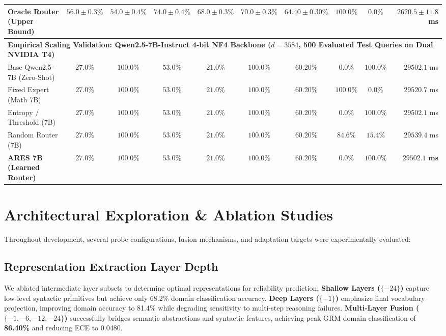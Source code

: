 \documentclass[journal,10pt,twocolumn]{IEEEtran}
\begin{document}
\begin{table}[t]
{\begin{tabular}{lccccccccr}
Oracle Router (Upper Bound) & $56.0 \pm 0.3\%$ & $54.0 \pm 0.4\%$ & $74.0 \pm 0.4\%$ & $68.0 \pm 0.3\%$ & $70.0 \pm 0.3\%$ & $64.40 \pm 0.30\%$ & $100.0\%$ & $0.0\%$ & $2620.5 \pm 11.8$ ms \\
\midrule
\multicolumn{10}{l}{\textbf{Empirical Scaling Validation: Qwen2.5-7B-Instruct 4-bit NF4 Backbone ($d=3584$, 500 Evaluated Test Queries on Dual NVIDIA T4)}} \\
\midrule
Base Qwen2.5-7B (Zero-Shot)         & $27.0\%$ & $100.0\%$ & $53.0\%$ & $21.0\%$ & $100.0\%$ & $60.20\%$ &  $0.0\%$ & $100.0\%$ & $29502.1$ ms \\
Fixed Expert (Math 7B)              & $27.0\%$ & $100.0\%$ & $53.0\%$ & $21.0\%$ & $100.0\%$ & $60.20\%$ & $100.0\%$ &   $0.0\%$ & $29520.7$ ms \\
Entropy / Threshold (7B)            & $27.0\%$ & $100.0\%$ & $53.0\%$ & $21.0\%$ & $100.0\%$ & $60.20\%$ &  $0.0\%$ & $100.0\%$ & $29502.1$ ms \\
Random Router (7B)                  & $27.0\%$ & $100.0\%$ & $53.0\%$ & $21.0\%$ & $100.0\%$ & $60.20\%$ & $84.6\%$ &  $15.4\%$ & $29539.4$ ms \\
\textbf{ARES 7B (Learned Router)}   & $\mathbf{27.0\%}$ & $\mathbf{100.0\%}$ & $\mathbf{53.0\%}$ & $\mathbf{21.0\%}$ & $\mathbf{100.0\%}$ & $\mathbf{60.20\%}$ &  $\mathbf{0.0\%}$ & $\mathbf{100.0\%}$ & $\mathbf{29502.1\text{ ms}}$ \\
\bottomrule
\end{tabular}%
}
\end{table}

\section{Architectural Exploration \& Ablation Studies}

Throughout development, several probe configurations, fusion mechanisms, and adaptation targets were experimentally evaluated:

\subsection{Representation Extraction Layer Depth}
We ablated intermediate layer subsets to determine optimal representations for reliability prediction. \textbf{Shallow Layers ($\{-24\}$)} capture low-level syntactic primitives but achieve only 68.2\% domain classification accuracy. \textbf{Deep Layers ($\{-1\}$)} emphasize final vocabulary projection, improving domain accuracy to 81.4\% while degrading sensitivity to multi-step reasoning failures. \textbf{Multi-Layer Fusion ($\{-1, -6, -12, -24\}$)} successfully bridges semantic abstractions and syntactic features, achieving peak GRM domain classification of \textbf{86.40\%} and reducing ECE to 0.0480.
\end{document}

